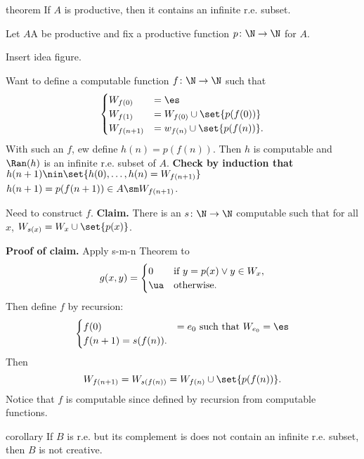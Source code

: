 \documentclass[class=article, crop=false]{standalone}
\begin{document}
\begin{result}{theorem}
  If $A$ is productive, then it contains an infinite r.e. subset.
\end{result}
\begin{pf}
  Let $A$A be productive and fix a productive function $p \colon \N \to \N$ for $A$.

  \begin{rem}
    Insert idea figure.
  \end{rem}

  Want to define a computable function $f\colon \N \to \N$ such that
    \[
      \begin{cases}
        W_{f(0)} &= \es \\
        W_{f(1)} &= W_{f(0)} \cup \set{p(f(0))} \\
        W_{f(n+1)} &= w_{f(n)} \cup \set{p(f(n))}.
      \end{cases}
    \]
  With such an $f$, ew define $h(n) = p(f(n))$. Then $h$ is computable and $\Ran(h)$ is an infinite r.e. subset of $A$. \textbf{Check by induction that $h(n+1) \nin \set{h(0),\ldots,h(n)=W_{f(n+1)}}$} $h(n+1) = p(f(n+1)) \in A \sm W_{f(n+1)}$.

  Need to construct $f$.
  \textbf{Claim.} There is an $s\colon\N \to \N$ computable such that for all $x$, $W_{s(x)} = W_x \cup \set{p(x)}$.

  \textbf{Proof of claim.} Apply s-m-n Theorem to
    \[
      g(x,y) =
        \begin{cases}
          0 & \text{if } y = p(x) \lor y \in W_x, \\
          \ua &\text{otherwise}.
        \end{cases}
    \]
  Then define $f$ by recursion:
    \[
      \begin{cases}
        f(0) &= e_0 \text{ such that } W_{e_0} = \es \\
        f(n+1) = s(f(n)).
      \end{cases}
    \]
  Then
    \[
      W_{f(n+1)} = W_{s(f(n))} = W_{f(n)} \cup \set{p(f(n))}.
    \]
  Notice that $f$ is computable since defined by recursion from computable functions.
\end{pf}

\begin{result}{corollary}
  If $B$ is r.e. but its complement is does not contain an infinite r.e. subset, then $B$ is not creative.
\end{result}
\end{document}
